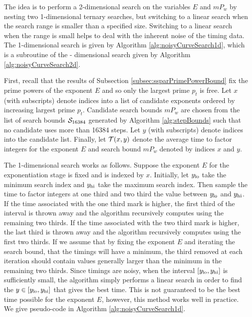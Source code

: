\documentclass{ucalgthes1}
\theoremstyle{definition}
\begin{document}
The idea is to perform a 2-dimensional search on the variables $E$ and $mP_w$ by nesting two 1-dimensional ternary searches, but switching to a linear search when the search range is smaller than a specified size.  Switching to a linear search when the range is small helps to deal with the inherent noise of the timing data.  The 1-dimensional search is given by Algorithm \ref{alg:noisyCurveSearch1d}, which is a subroutine of the - dimensional search given by Algorithm \ref{alg:noisyCurveSearch2d}.

First, recall that the results of Subsection \ref{subsec:ssparPrimePowerBound} fix the prime powers of the exponent $E$ and so only the largest prime $p_t$ is free.  Let $x$ (with subscripts) denote indices into a list of candidate exponents ordered by increasing largest prime $p_t$.  Candidate search bounds $mP_w$ are chosen from the list of search bounds $\mathcal S_{16384}$ generated by Algorithm \ref{alg:stepBounds} such that no candidate uses more than 16384 steps.  Let $y$ (with subscripts) denote indices into the candidate list.  Finally, let $\mathcal T(x, y)$ denote the average time to factor integers for the exponent $E$ and search bound $mP_w$ denoted by indices $x$ and $y$.

The 1-dimensional search works as follows.  Suppose the exponent $E$ for the exponentiation stage is fixed and is indexed by $x$. Initially, let $y_{\textrm{lo}}$ take the minimum search index and $y_{\textrm{hi}}$ take the maximum search index.  Then sample the time to factor integers at one third and two third the value between $y_{\textrm{lo}}$ and $y_{\textrm{hi}}$.  If the time associated with the one third mark is higher, the first third of the interval is thrown away and the algorithm recursively computes using the remaining two thirds.  If the time associated with the two third mark is higher, the last third is thrown away and the algorithm recursively computes using the first two thirds.  If we assume that by fixing the exponent $E$ and iterating the search bound, that the timings will have a minimum, the third removed at each iteration should contain values generally larger than the minimum in the remaining two thirds.   Since timings are noisy, when the interval $[y_{\textrm{lo}}, y_{\textrm{hi}}]$ is sufficiently small, the algorithm simply performs a linear search in order to find the $y \in [y_{\textrm{lo}}, y_{\textrm{hi}}]$ that gives the best time.  This is not guaranteed to be the best time possible for the exponent $E$, however, this method works well in practice.  We give pseudo-code in Algorithm \ref{alg:noisyCurveSearch1d}.
\end{document}

